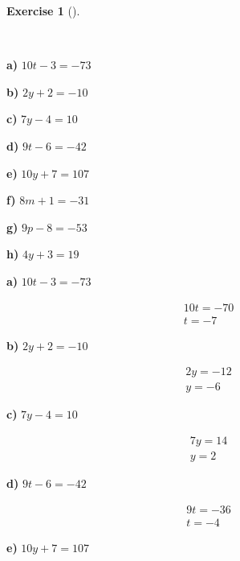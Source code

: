 \documentclass[
  letterpaper,
  DIV=11,
  numbers=noendperiod]{scrreprt}
\theoremstyle{definition}
\newtheorem{exercise}{Exercise}[chapter]
\theoremstyle{remark}
\begin{document}
\begin{exercise}[]\protect\hypertarget{exr-u5-4}{}\label{exr-u5-4}

~

\textbf{a)} \(\displaystyle 10t - 3 = -73\)

\textbf{b)} \(\displaystyle 2y + 2 = -10\)

\textbf{c)} \(\displaystyle 7y - 4 = 10\)

\textbf{d)} \(\displaystyle 9t - 6 = -42\)

\textbf{e)} \(\displaystyle 10y + 7 = 107\)

\textbf{f)} \(\displaystyle 8m + 1 = -31\)

\textbf{g)} \(\displaystyle 9p - 8 = -53\)

\textbf{h)} \(\displaystyle 4y + 3 = 19\)

\begin{tcolorbox}[enhanced jigsaw, opacitybacktitle=0.6, coltitle=black, arc=.35mm, colframe=quarto-callout-tip-color-frame, colback=white, bottomrule=.15mm, left=2mm, colbacktitle=quarto-callout-tip-color!10!white, titlerule=0mm, opacityback=0, title=\textcolor{quarto-callout-tip-color}{\faLightbulb}\hspace{0.5em}{🔍 View Solutions}, leftrule=.75mm, breakable, rightrule=.15mm, bottomtitle=1mm, toptitle=1mm, toprule=.15mm]

\textbf{a)} \(\displaystyle 10t - 3 = -73\)

\begin{align*}
10t = -70 \\ t = -7
\end{align*}

\textbf{b)} \(\displaystyle 2y + 2 = -10\)

\begin{align*}
2y = -12 \\ y = -6
\end{align*}

\textbf{c)} \(\displaystyle 7y - 4 = 10\)

\begin{align*}
7y = 14 \\ y = 2
\end{align*}

\textbf{d)} \(\displaystyle 9t - 6 = -42\)

\begin{align*}
9t = -36 \\ t = -4
\end{align*}

\textbf{e)} \(\displaystyle 10y + 7 = 107\)


\end{tcolorbox}
\end{exercise}
\end{document}
